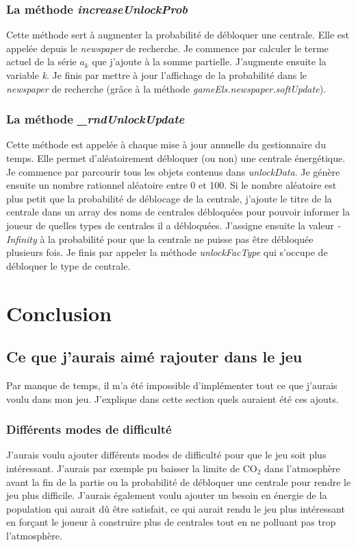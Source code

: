 \documentclass{article}
\begin{document}
        \subsubsection{La méthode \textit{increaseUnlockProb}}
        Cette méthode sert à augmenter la probabilité de débloquer une centrale. Elle est appelée depuis le \textit{newspaper} de recherche.
        Je commence par calculer le terme actuel de la série $a_{k}$ que j'ajoute à la somme partielle. J'augmente ensuite la variable \textit{k}. Je finis par mettre à jour l'affichage de la probabilité dans le \textit{newspaper} de recherche (grâce à la méthode \textit{gameEls.newspaper.softUpdate}).
        
        \subsubsection{La méthode \textit{\_rndUnlockUpdate}} \label{rndUnlockUpdate}
        Cette méthode est appelée à chaque mise à jour annuelle du gestionnaire du temps. Elle permet d'aléatoirement débloquer (ou non) une centrale énergétique. Je commence par parcourir tous les objets contenus dans \textit{unlockData}. Je génère ensuite un nombre rationnel aléatoire entre 0 et 100. Si le nombre aléatoire est plus petit que la probabilité de déblocage de la centrale, j'ajoute le titre de la centrale dans un array des noms de centrales débloquées pour pouvoir informer la joueur de quelles types de centrales il a débloquées. J'assigne ensuite la valeur \textit{-Infinity} à la probabilité pour que la centrale ne puisse pas être débloquée plusieurs fois. Je finis par appeler la méthode \textit{unlockFacType} qui s'occupe de débloquer le type de centrale.
        
        \section{Conclusion}
        \subsection{Ce que j'aurais aimé rajouter dans le jeu} \label{ajoutJeu}
		Par manque de temps, il m'a été impossible d'implémenter tout ce que j'aurais voulu dans mon jeu. J'explique dans cette section quels auraient été ces ajouts.
		
		\subsubsection{Différents modes de difficulté}
		J'aurais voulu ajouter différents modes de difficulté pour que le jeu soit plus intéressant. J'aurais par exemple pu baisser la limite de CO$_{2}$ dans l'atmosphère avant la fin de la partie ou la probabilité de débloquer une centrale pour rendre le jeu plus difficile. J'aurais également voulu ajouter un besoin en énergie de la population qui aurait dû être satisfait, ce qui aurait rendu le jeu plus intéressant en forçant le joueur à construire plus de centrales tout en ne polluant pas trop l'atmosphère.
		
\end{document}
